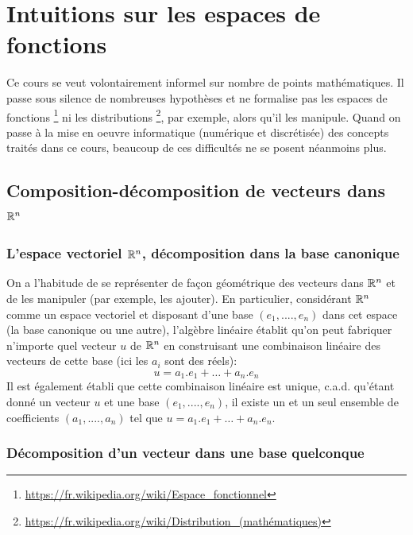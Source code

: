 
\chapter{Intuitions sur les espaces de fonctions}

Ce cours se veut volontairement informel sur nombre de points mathématiques. Il passe sous silence de nombreuses hypothèses et ne formalise pas les espaces de fonctions \footnote{\url{https://fr.wikipedia.org/wiki/Espace_fonctionnel}} ni les distributions \footnote{\url{https://fr.wikipedia.org/wiki/Distribution_(mathématiques)}}, par exemple, alors qu'il les manipule. Quand on passe à la mise en oeuvre informatique (numérique et discrétisée) des concepts traités dans ce cours, beaucoup de ces difficultés ne se posent néanmoins plus.

\section{Composition-décomposition de vecteurs dans \texorpdfstring{$\mathbb{R}^n$}{\pdfRR\superscriptn}}

\subsection{L'espace vectoriel \texorpdfstring{$\mathbb{R}^n$}{\pdfRR\superscriptn}, décomposition dans la base canonique}

On a l'habitude de se représenter de façon géométrique des vecteurs dans $\mathbb{R}^n$ et de les manipuler (par exemple, les ajouter). En particulier, considérant $\mathbb{R}^n$ comme un espace vectoriel et disposant d'une base $(e_1,....,e_n)$ dans cet espace (la base canonique ou une autre), l'algèbre linéaire établit qu'on peut fabriquer n'importe quel vecteur $u$ de $\mathbb{R}^n$ en construisant une combinaison linéaire des vecteurs de cette base (ici les $a_i$ sont des réels):
\begin{equation}
u=a_1.e_1+\dots+a_n.e_n
\label{eq:decomposition_lineaire}
\end{equation} 
Il est également établi que cette combinaison linéaire est unique, c.a.d. qu'étant donné un vecteur $u$ et une base $(e_1,....,e_n)$, il existe un et un seul ensemble de coefficients $(a_1,....,a_n)$ tel que $u=a_1.e_1+\dots+a_n.e_n$.

\subsection{Décomposition d'un vecteur dans une base quelconque}

